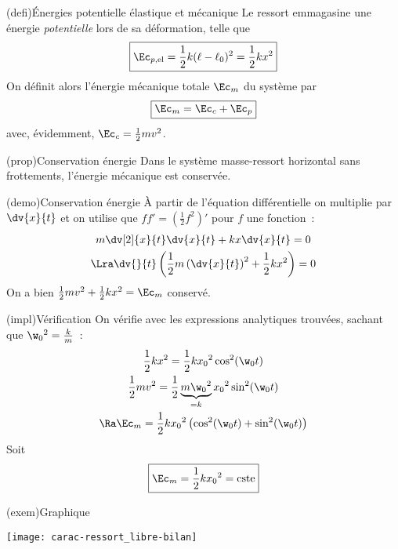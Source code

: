 \documentclass[../../main/main.tex]{subfiles}
\begin{document}
\begin{tcbraster}[raster columns=2, raster equal height=rows]
	\begin{tcb}[label=def:emeca](defi){Énergies potentielle élastique et mécanique}
		Le ressort emmagasine une énergie \textit{potentielle} lors de sa
		déformation, telle que
		\[\boxed{\Ec_{p\rm, el} = \frac{1}{2}k(\ell-\ell_0)^2 = \frac{1}{2}kx^2}\]
		On définit alors l'énergie mécanique totale $\Ec_m$ du système par
		\[\boxed{\Ec_m = \Ec_c + \Ec_p}\]
		avec, évidemment, $\Ec_c = \frac{1}{2}mv^2$.
	\end{tcb}
	\begin{tcolorbox}[blankest, raster multicolumn=1, space to=\myspace]
		\begin{tcbraster}[raster columns=1]
			\begin{tcb}[label=prop:emecacons](prop){Conservation énergie}
				Dans le système masse-ressort horizontal sans frottements, l'énergie
				mécanique est conservée.
			\end{tcb}
			\begin{tcb}[label=demo:emecacons](demo){Conservation énergie}
				À partir de l'équation différentielle on multiplie par $\dv{x}{t}$ et on
				utilise que $ff' = (\frac{1}{2}f^2)'$ pour $f$ une fonction~:
				\begin{gather*}
					m \dv[2]{x}{t} \dv{x}{t} + kx \dv{x}{t} = 0\\
					\Lra \dv{}{t} \left( \frac{1}{2}m \left( \dv{x}{t} \right)^2 +
					\frac{1}{2}kx^2 \right) = 0
				\end{gather*}
				On a bien $ \frac{1}{2}mv^2 + \frac{1}{2}kx^2 = \Ec_m$ conservé.
			\end{tcb}
		\end{tcbraster}
	\end{tcolorbox}
	\begin{tcb}[label=impl](impl){Vérification}
		On vérifie avec les expressions analytiques trouvées, sachant que
		$\w_0{}^2 = \frac{k}{m}$~:
		\begin{gather*}
			\frac{1}{2}kx^2 = \frac{1}{2}kx_0{}^2\cos^2(\w_0t)\\
			\frac{1}{2}mv^2 =
			\frac{1}{2}\underbrace{m\w_0{}^2}_{=k}x_0{}^2\sin^2(\w_0t)\\
			\Ra \Ec_m = \frac{1}{2}kx_0{}^2 \left( \cos^2(\w_0t) +
			\sin^2(\w_0t) \right)
		\end{gather*}
		Soit
		\begin{equation*}
			\boxed{\Ec_m = \frac{1}{2}kx_0{}^2 = \text{cste}}
		\end{equation*}
	\end{tcb}
	\begin{tcb}[width=\linewidth](exem){Graphique}
		\begin{center}
			\texttt{[image: carac-ressort\_libre-bilan]}
		\end{center}
	\end{tcb}
\end{tcbraster}
\end{document}
